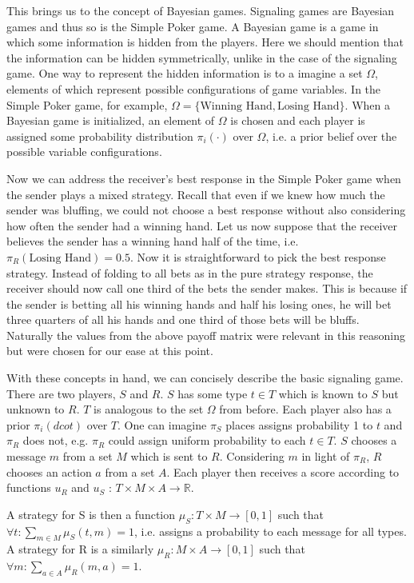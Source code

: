 \documentclass{article}
\begin{document}
This brings us to the concept of Bayesian games. Signaling games are Bayesian games and thus so is the Simple Poker game. A Bayesian game is a game in which some information is hidden from the players. Here we should mention that the information can be hidden symmetrically, unlike in the case of the signaling game. One way to represent the hidden information is to a imagine a set $\Omega$, elements of which represent possible configurations of game variables. In the Simple Poker game, for example, $\Omega = \{\text{Winning Hand}, \text{Losing Hand}\}$. When a Bayesian game is initialized, an element of $\Omega$ is chosen and each player is assigned some probability distribution $\pi_{i}(\cdot)$ over $\Omega$, i.e. a prior belief over the possible variable configurations.

Now we can address the receiver's best response in the Simple Poker game when the sender plays a mixed strategy. Recall that even if we knew how much the sender was bluffing, we could not choose a best response without also considering how often the sender had a winning hand. Let us now suppose that the receiver believes the sender has a winning hand half of the time, i.e. $\pi_R(\text{Losing Hand}) = 0.5$. Now it is straightforward to pick the best response strategy. Instead of folding to all bets as in the pure strategy response, the receiver should now call one third of the bets the sender makes. This is because if the sender is betting all his winning hands and half his losing ones, he will bet three quarters of all his hands and one third of those bets will be bluffs. Naturally the values from the above payoff matrix were relevant in this reasoning but were chosen for our ease at this point.

With these concepts in hand, we can concisely describe the basic signaling game. There are two players, $S$ and $R$. $S$ has some type $t \in T$ which is known to $S$ but unknown to $R$. $T$ is analogous to the set $\Omega$ from before. Each player also has a prior $ \pi_i(dcot)$ over $T$. One can imagine $\pi_{S}$ places assigns probability 1 to $t$ and $\pi_{R}$ does not, e.g. $\pi_{R}$ could assign uniform probability to each $t \in T$. $S$ chooses a message $m$ from a set $M$ which is sent to $R$. Considering $m$ in light of $\pi_R$, $R$ chooses an action $a$ from a set $A$. Each player then receives a score according to functions $u_R$ and $u_S$ : $T \times M \times A \to \mathbb{R}$.

A strategy for S is then a function $\mu_{S}: T \times M \to [0,1]$ such that $\forall t: \sum_{m \in M} \mu_{S}(t, m) = 1$, i.e. assigns a probability to each message for all types. A strategy for R is a similarly $\mu_{R} : M \times A \to [0,1]$ such that $\forall m: \sum_{a \in A} \mu_{R}(m,a) = 1$.
\end{document}
